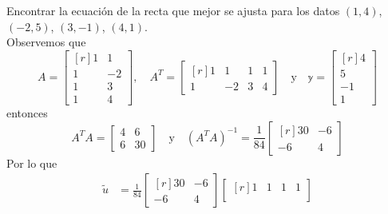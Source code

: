 \begin{example}
    Encontrar la ecuación de la recta que mejor se ajusta para los datos $(1, 4)$, $(-2, 5)$, $(3, -1)$, $(4, 1)$. \\
    \solucion Observemos que
    $$A = \begin{bmatrix*}[r]
        1 & 1 \\
        1 & -2 \\
        1 & 3 \\
        1 & 4
    \end{bmatrix*}, \!\quad A^T = \begin{bmatrix*}[r]
        1 & 1 & 1 & 1 \\
        1 & -2 & 3 & 4
    \end{bmatrix*} \quad \text{y} \quad \mathbb{y} = \begin{bmatrix*}[r]
        4 \\
        5 \\
        -1 \\
        1
    \end{bmatrix*}$$
    entonces
    $$A^TA = \begin{bmatrix}
        4 & 6 \\
        6 & 30
    \end{bmatrix} \quad \text{y} \quad \left(A^T A\right)^{-1} = \frac{1}{84} \begin{bmatrix*}[r]
        30 & -6 \\
        -6 & 4
    \end{bmatrix*}$$\newpage\noindent
    Por lo que
    \begin{align*}
        \tilde{u} & = \frac{1}{84} \begin{bmatrix*}[r]
            30 & -6 \\
            -6 & 4
        \end{bmatrix*} \begin{bmatrix*}[r]
            1 & 1 & 1 & 1 \\

\end{bmatrix*}
\end{align*}
\end{example}
